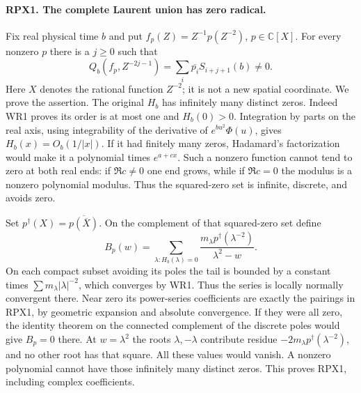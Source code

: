\paragraph{RPX1. The complete Laurent union has zero radical.}
Fix real physical time $b$ and put
$f_p(Z)=Z^{-1}p(Z^{-2})$, $p\in\mathbb C[X]$. For every nonzero
$p$ there is a $j\ge0$ such that
\[
 Q_b(f_p,Z^{-2j-1})=\sum_i\overline{p_i}S_{i+j+1}(b)\ne0.
 \tag{RPX1}
\]
Here $X$ denotes the rational function $Z^{-2}$; it is not a new
spatial coordinate. We prove the assertion. The original $H_b$ has
infinitely many distinct zeros. Indeed WR1 proves its order is at
most one and $H_b(0)>0$. Integration by parts on the real axis,
using integrability of the derivative of $e^{bu^2}\Phi(u)$, gives
$H_b(x)=O_b(1/|x|)$. If it had finitely many zeros, Hadamard's
factorization would make it a polynomial times $e^{a+cx}$.
Such a nonzero function cannot tend to zero at both real ends:
if $\Re c\ne0$ one end grows, while if $\Re c=0$ the modulus
is a nonzero polynomial modulus. Thus the squared-zero set is
infinite, discrete, and avoids zero.

Set $p^\dagger(X)=\overline{p(\overline X)}$. On the complement
of that squared-zero set define
\[
 B_p(w)=\sum_{\lambda:H_b(\lambda)=0}
 \frac{m_\lambda p^\dagger(\lambda^{-2})}{\lambda^2-w}.
 \tag{RPX2}
\]
On each compact subset avoiding its poles the tail is bounded by
a constant times $\sum m_\lambda|\lambda|^{-2}$, which converges
by WR1. Thus the series is locally normally convergent there.
Near zero its power-series coefficients are exactly the pairings
in RPX1, by geometric expansion and absolute convergence.
If they were all zero, the identity theorem on the connected
complement of the discrete poles would give $B_p=0$ there.
At $w=\lambda^2$ the roots $\lambda,-\lambda$ contribute residue
$-2m_\lambda p^\dagger(\lambda^{-2})$, and no other root has that
square. All these values would vanish. A nonzero polynomial
cannot have those infinitely many distinct zeros. This proves
RPX1, including complex coefficients.


